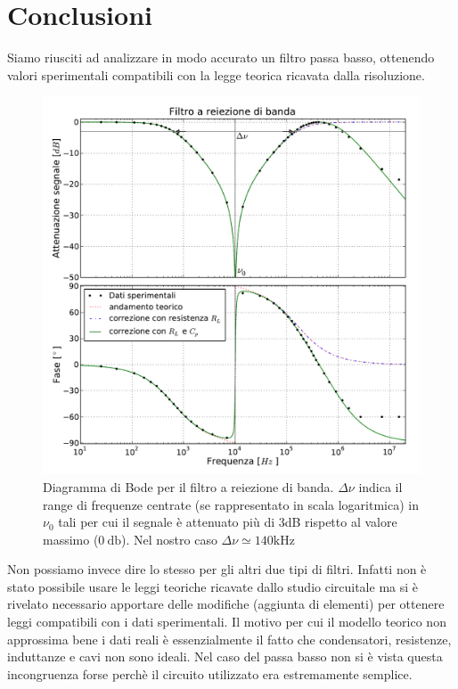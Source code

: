 \section{Conclusioni}

Siamo riusciti ad analizzare in modo accurato un filtro passa basso, ottenendo valori sperimentali compatibili con la legge teorica ricavata dalla risoluzione.

\begin{figure}
    \includegraphics[width=120mm]{notch2.pdf}
    \caption{Diagramma di Bode per il filtro a reiezione di banda. $\Delta \nu$ indica il range di frequenze centrate (se rappresentato in scala logaritmica) in $\nu_0$ tali per cui il segnale è attenuato più di 3dB rispetto al valore massimo ($\SI{0}{\decibel}$). Nel nostro caso $\Delta \nu \simeq 140 \si{\kilo\hertz}$}
    \label{fig:notch}
\end{figure}

Non possiamo invece dire lo stesso per gli altri due tipi di filtri. Infatti non è stato possibile usare le leggi teoriche ricavate dallo studio circuitale ma si è rivelato necessario apportare delle modifiche (aggiunta di elementi) per ottenere leggi compatibili con i dati sperimentali. Il motivo per cui il modello teorico non approssima bene i dati reali è essenzialmente il fatto che condensatori, resistenze, induttanze e cavi non sono ideali. Nel caso del passa basso non si è vista questa incongruenza forse perchè il circuito utilizzato era estremamente semplice. 

